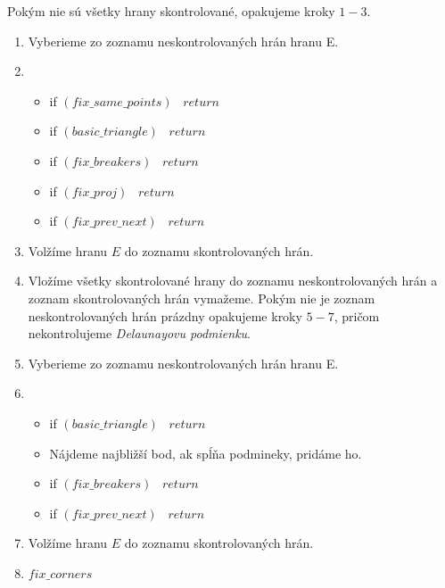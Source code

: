 Pokým nie sú všetky hrany skontrolované, opakujeme kroky $1-3$.
\begin{enumerate}
    \item{
        Vyberieme zo zoznamu neskontrolovaných hrán hranu E.
    }
    \item{
        \begin{itemize}
            \item{
                if $(fix\_same\_points)$ \, $return$
            }
            \item{
                if $(basic\_triangle)$ \, $return$
            }
            \item{
                if $(fix\_breakers)$ \, $return$
            }
            \item{
                if $(fix\_proj)$ \, $return$
            }
            \item{
                if $(fix\_prev\_next)$ \, $return$
            }
        \end{itemize}
    }
    \item{
        Volžíme hranu $E$ do zoznamu skontrolovaných hrán.
    }
    \item{
        Vložíme všetky skontrolované hrany do zoznamu neskontrolovaných hrán a 
        zoznam skontrolovaných hrán vymažeme. Pokým nie je zoznam neskontrolovaných hrán prázdny
        opakujeme kroky $5-7$, pričom nekontrolujeme \textit{Delaunayovu podmienku}.
    }
    \item{
        Vyberieme zo zoznamu neskontrolovaných hrán hranu E.
    }
    \item{
        \begin{itemize}
            \item{
                if $(basic\_triangle)$ \, $return$
            }
            \item{
                Nájdeme najbližší bod, ak spĺňa podmineky, pridáme ho.
            }
            \item{
                if $(fix\_breakers)$ \, $return$
            }
            \item{
                if $(fix\_prev\_next)$ \, $return$
            }
        \end{itemize}
    }
    \item{
        Volžíme hranu $E$ do zoznamu skontrolovaných hrán.
    }
    \item{
        $fix\_corners$
    }
\end{enumerate}

